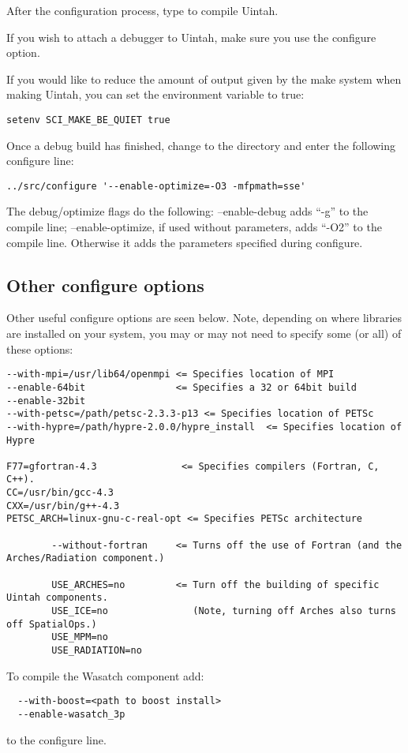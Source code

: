 \documentclass[11pt,fleqn]{book} %
\begin{document}
After the configuration process, type  to compile Uintah.

If you wish to attach a debugger to Uintah, make sure you use the
 configure option.

If you would like to reduce the amount of output given by the make
system when making Uintah, you can set the environment variable
 to true:

\begin{lstlisting}
setenv SCI_MAKE_BE_QUIET true
\end{lstlisting}

Once a debug build has finished, change to the  directory and
enter the following configure line:

\begin{lstlisting}
../src/configure '--enable-optimize=-O3 -mfpmath=sse' 
\end{lstlisting}

The debug/optimize flags do the following:  --enable-debug adds ``-g''
to the compile line; --enable-optimize, if used without parameters,
adds ``-O2'' to the compile line.  Otherwise it adds the parameters
specified during configure.

\subsection{Other configure options}

Other useful configure options are seen below.  Note, depending on
where libraries are installed on your system, you may or may not need
to specify some (or all) of these options:

\begin{lstlisting}
--with-mpi=/usr/lib64/openmpi <= Specifies location of MPI
--enable-64bit                <= Specifies a 32 or 64bit build
--enable-32bit
--with-petsc=/path/petsc-2.3.3-p13 <= Specifies location of PETSc
--with-hypre=/path/hypre-2.0.0/hypre_install  <= Specifies location of Hypre

F77=gfortran-4.3               <= Specifies compilers (Fortran, C, C++).
CC=/usr/bin/gcc-4.3
CXX=/usr/bin/g++-4.3
PETSC_ARCH=linux-gnu-c-real-opt <= Specifies PETSc architecture

        --without-fortran     <= Turns off the use of Fortran (and the Arches/Radiation component.)

        USE_ARCHES=no         <= Turn off the building of specific Uintah components.
        USE_ICE=no               (Note, turning off Arches also turns off SpatialOps.)
        USE_MPM=no
        USE_RADIATION=no

\end{lstlisting}
To compile the Wasatch component add:
\begin{lstlisting}
  --with-boost=<path to boost install>
  --enable-wasatch_3p
\end{lstlisting}
to the configure line.
\end{document}
